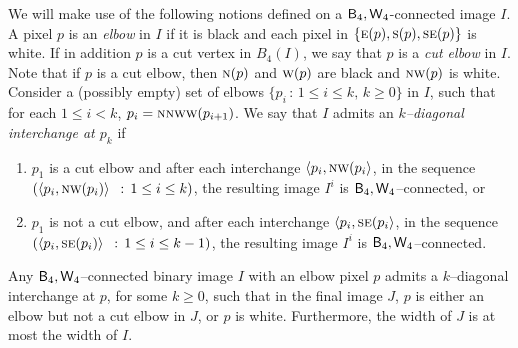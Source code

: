 \documentclass[lotsofwhite,charterfonts]{patmorin}
\newcommand{\fourfour}{\ensuremath{\protect\textup{\textsf{B}}_{4},\protect\textup{\textsf{W}}_{4}}}
\newcommand{\N}{\textsc{n}}
\newcommand{\E}{\textsc{e}}
\newcommand{\SE}{\textsc{se}}
\renewcommand{\S}{\textsc{s}}
\newcommand{\W}{\textsc{w}}
\newcommand{\NW}{\textsc{nw}}
\newcommand{\ic}[2]{\langle #1,#2 \rangle}
\begin{document}
We will make use of the following notions defined on a \fourfour-connected image $I$. A pixel $p$ is an \emph{elbow} in $I$ if it is black and each pixel in $\{\E(p), \S(p), \SE(p)\}$ is white. If in addition $p$ is a cut vertex in $B_4(I)$, we say that $p$ is a \emph{cut elbow} in $I$. Note that if $p$ is a cut elbow, then $\N(p)$ and $\W(p)$ are black and $\NW(p)$ is white. Consider a (possibly empty) set of elbows $\{p_i\, :\, 1\leq i\leq k, \, k\geq 0\}$ in $I$, such that for each $1\leq i< k$, $p_i=\N\N\W\W(p_{i+1})$. We say that $I$ admits an \emph{$k$--diagonal interchange at $p_k$} if 



\begin{enumerate}
\item $p_1$ is a cut elbow and after each interchange $\ic{p_i}{\NW(p_i}$, in the sequence  $(\ic{p_i}{\NW(p_i)}\,\ :\, 1\leq i\leq k)$, the resulting image $I^i$ is $\fourfour$--connected, or

\item $p_1$ is not a cut elbow, and after each interchange $\ic{p_i}{\SE(p_i}$, in the sequence  $(\ic{p_i}{\SE(p_i)}\,\ :\, 1\leq i\leq k-1)$, the resulting image $I^i$ is $\fourfour$--connected.
\end{enumerate}

\begin{lem}
Any \fourfour--connected binary image $I$ with an elbow pixel $p$ admits a $k$--diagonal interchange at $p$, for some $k\geq 0$, such that in the final image $J$, $p$ is either an elbow but not a cut elbow in $J$, or $p$ is white. Furthermore, the width of $J$ is at most the width of $I$. 
\end{lem}
\end{document}
